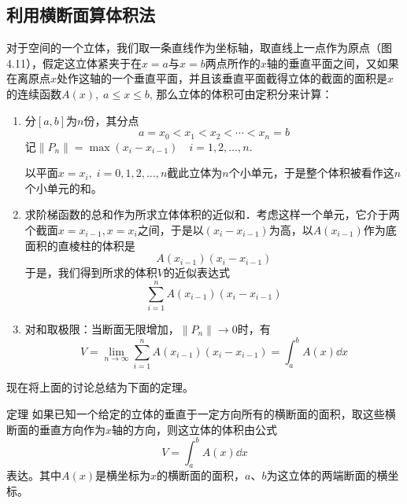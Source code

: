 \subsection{利用横断面算体积法}
对于空间的一个立体，我们取一条直线作为坐标轴，取直线上一点作为原点（图4.11），假定这立体紧夹于在$x=a$与$x=b$两点所作的$x$轴的垂直平面之间，又如果在离原点$x$处作这轴的一个垂直平面，并且该垂直平面截得立体的截面的面积是$x$的连续函数$A(x),\; a\le x\le b$, 那么立体的体积可由定积分来计算：
\begin{figure}[htp]
    \centering
{}
    \caption{}
\end{figure}

\begin{enumerate}
    \item 分$[a,b]$为$n$份，其分点
\[a=x_0<x_1<x_2<\cdots<x_n=b\]
    记$\|P_n\|=\max(x_i-x_{i-1})\quad i=1, 2,\ldots,n$.

    以平面$x=x_i,\; i=0, 1, 2,\ldots,n$截此立体为$n$个小单元，于是整个体积被看作这$n$个小单元的和。
\item  求阶梯函数的总和作为所求立体体积的近似和．考虑这样一个单元，它介于两个截面$x=x_{i-1},x=x_i$之间，于是以$(x_i-x_{i-1})$为高，以$A(x_{i-1})$作为底面积的直棱柱的体积是
  \[  A (x_{i-1}) (x_i-x_{i-1})\]
    于是，我们得到所求的体积$V$的近似表达式
    \[\sum^n_{i=1}A (x_{i-1}) (x_i-x_{i-1})\] 
    \item 对和取极限：当断面无限增加，$\|P_n\|\to 0$时，有
\[V=\lim_{n\to\infty}\sum^n_{i=1}A (x_{i-1}) (x_i-x_{i-1})=\int^b_a A(x)\dd x\]
\end{enumerate}

现在将上面的讨论总结为下面的定理。

\begin{blk}
   {定理} 如果已知一个给定的立体的垂直于一定方向所有的横断面的面积，取这些横断面的垂直方向作为$x$轴的方向，则这立体的体积由公式
\[V=\int^b_a A (x) \dd x\]
表达。其中$A(x)$是横坐标为$x$的横断面的面积，$a$、$b$为这立体的两端断面的横坐标。 
\end{blk}

